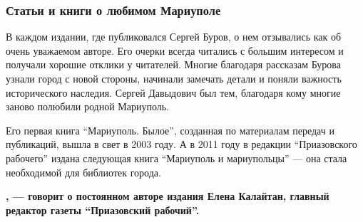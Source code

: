  
 
 
 
 

\subsubsection{Статьи и книги о любимом Мариуполе}

В каждом издании, где публиковался Сергей Буров, о нем отзывались как об очень
уважаемом авторе. Его очерки всегда читались с большим интересом и получали
хорошие отклики у читателей. Многие благодаря рассказам Бурова узнали город с
новой стороны, начинали замечать детали и поняли важность исторического
наследия. Сергей Давыдович был тем, благодаря кому многие заново полюбили
родной Мариуполь.

Его первая книга \enquote{Мариуполь. Былое}, созданная по материалам передач и
публикаций, вышла в свет в 2003 году. А в 2011 году в редакции \enquote{Приазовского
рабочего} издана следующая книга \enquote{Мариуполь и мариупольцы} — она стала
необходимой для библиотек города.

\begin{leftbar}
	\begingroup
		\bfseries
{}, —
говорит о постоянном авторе издания Елена Калайтан, главный редактор
газеты \enquote{Приазовский рабочий}.
	\endgroup
\end{leftbar}

